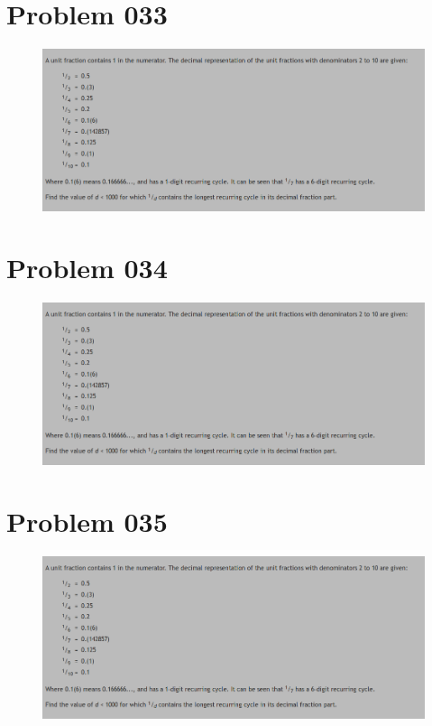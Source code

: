 \section{Problem 033}
\begin{prob}
	\begin{figure}[htb!]
		\begin{center}
			\includegraphics[scale = 0.4]{pic/026.png}
		\end{center}
	\end{figure}
\end{prob}
\section{Problem 034}
\begin{prob}
	\begin{figure}[htb!]
		\begin{center}
			\includegraphics[scale = 0.4]{pic/026.png}
		\end{center}
	\end{figure}
\end{prob}
\section{Problem 035}
\begin{prob}
	\begin{figure}[htb!]
		\begin{center}
			\includegraphics[scale = 0.4]{pic/026.png}
		\end{center}
	\end{figure}
\end{prob}
